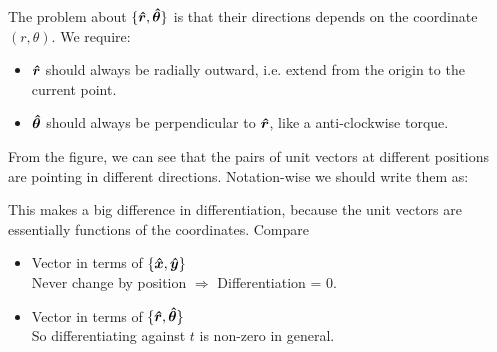 \documentclass[class=article, crop=false, 12pt]{standalone}
\begin{document}
The problem about $\{\vu*{r}, \vu*{\theta}\}$ is that their directions depends on the coordinate $(r, \theta)$. 
We require:
\begin{itemize}
    \item $\vu*{r}$ should always be radially outward, 
    i.e. extend from the origin to the current point.
    
    \item $\vu*{\theta}$ should always be perpendicular to $\vu*{r}$, 
    like a anti-clockwise torque. 
    
\end{itemize}


From the figure, we can see that the pairs of unit vectors at different positions are pointing in different directions. 
Notation-wise we should write them as:

This makes a big difference in differentiation, because the unit vectors are essentially functions of the coordinates. Compare
\begin{itemize}
    \item Vector in terms of $\{\vu*{x}, \vu*{y}\}$\\
    Never change by position $\Rightarrow$ Differentiation = 0.
    

    \item Vector in terms of $\{\vu*{r}, \vu*{\theta}\}$\\
    So differentiating against $t$ is non-zero in general.

\end{itemize}
\end{document}

